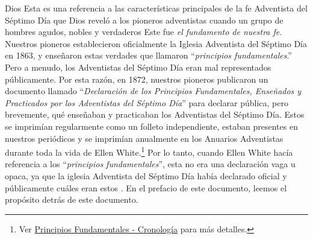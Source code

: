 Dios  Esta es una referencia a las características principales de la fe Adventista del Séptimo Día que Dios reveló a los pioneros adventistas  cuando un grupo de hombres agudos, nobles y verdaderos  Este fue \textit{el fundamento de nuestra fe}. Nuestros pioneros establecieron oficialmente la Iglesia Adventista del Séptimo Día en 1863, y enseñaron estas verdades que llamaron “\textit{principios fundamentales}.” Pero a menudo, los Adventistas del Séptimo Día eran mal representados públicamente. Por esta razón, en 1872, nuestros pioneros publicaron un documento llamado “\textit{Declaración de los Principios Fundamentales, Enseñados y Practicados por los Adventistas del Séptimo Día}” para declarar pública, pero brevemente, qué  enseñaban y practicaban los Adventistas del Séptimo Día. Estos  se imprimían regularmente como un folleto independiente, estaban presentes en nuestros periódicos y se imprimían anualmente en los Anuarios Adventistas durante toda la vida de Ellen White.\footnote{Ver \hyperref[appendix:timeline]{Principios Fundamentales - Cronología} para más detalles.} Por lo tanto, cuando Ellen White hacía referencia a los “\textit{principios fundamentales}”, esta no era una declaración vaga u opaca, ya que la iglesia Adventista del Séptimo Día había declarado oficial y públicamente cuáles eran estos . En el prefacio de este documento, leemos el propósito detrás de este documento.


